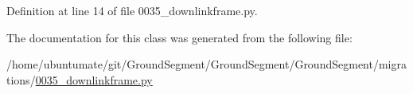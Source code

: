 Definition at line 14 of file 0035\+\_\+downlinkframe.\+py.



The documentation for this class was generated from the following file\+:\begin{DoxyCompactItemize}
\item 
/home/ubuntumate/git/\+Ground\+Segment/\+Ground\+Segment/\+Ground\+Segment/migrations/\hyperlink{0035__downlinkframe_8py}{0035\+\_\+downlinkframe.\+py}\end{DoxyCompactItemize}
